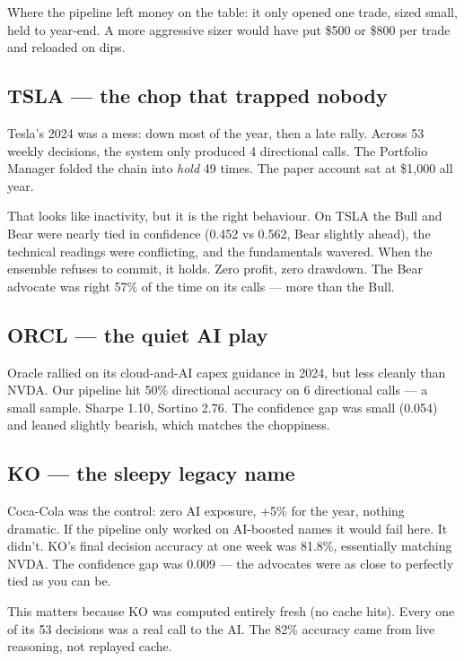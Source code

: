 \documentclass[11pt,a4paper]{article}
\begin{document}
Where the pipeline left money on the table: it only opened one trade,
sized small, held to year-end. A more aggressive sizer would have put
\$500 or \$800 per trade and reloaded on dips.

\subsection*{TSLA --- the chop that trapped nobody}

Tesla's 2024 was a mess: down most of the year, then a late rally. Across
53 weekly decisions, the system only produced 4 directional calls. The
Portfolio Manager folded the chain into \textit{hold} 49 times. The paper
account sat at \$1{,}000 all year.

That looks like inactivity, but it is the right behaviour. On TSLA the
Bull and Bear were nearly tied in confidence (0.452 vs 0.562, Bear
slightly ahead), the technical readings were conflicting, and the
fundamentals wavered. When the ensemble refuses to commit, it holds.
Zero profit, zero drawdown. The Bear advocate was right 57\% of the time
on its calls --- more than the Bull.

\subsection*{ORCL --- the quiet AI play}

Oracle rallied on its cloud-and-AI capex guidance in 2024, but less
cleanly than NVDA. Our pipeline hit 50\% directional accuracy on 6
directional calls --- a small sample. Sharpe 1.10, Sortino 2.76. The
confidence gap was small (0.054) and leaned slightly bearish, which
matches the choppiness.

\subsection*{KO --- the sleepy legacy name}

Coca-Cola was the control: zero AI exposure, +5\% for the year, nothing
dramatic. If the pipeline only worked on AI-boosted names it would fail
here. It didn't. KO's final decision accuracy at one week was 81.8\%,
essentially matching NVDA. The confidence gap was 0.009 --- the
advocates were as close to perfectly tied as you can be.

This matters because KO was computed entirely fresh (no cache hits).
Every one of its 53 decisions was a real call to the AI. The 82\%
accuracy came from live reasoning, not replayed cache.
\end{document}
